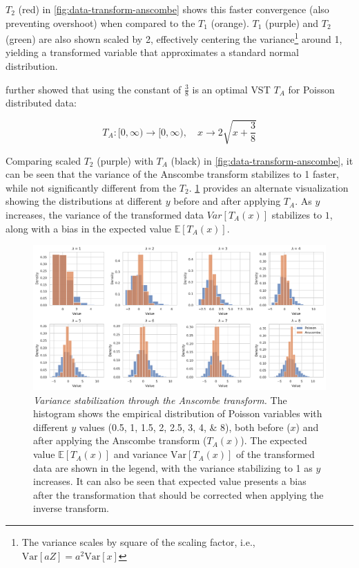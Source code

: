 $T_2$ (red) in \cref{fig:data-transform-anscombe} shows this faster convergence (also preventing overshoot) when compared to the $T_1$ (orange). $T_1$ (purple) and $T_2$ (green) are also shown scaled by \num{2}, effectively centering the variance\footnote{The variance scales by square of the scaling factor, i.e., $\text{Var}[aZ] = a^2 \text{Var}[x]$} around \num{1}, yielding a transformed variable that approximates a standard normal distribution.

\citeauthor{anscombeTransformationPoissonBinomial1948} \cite{anscombeTransformationPoissonBinomial1948} further showed that using the  constant of $\frac{3}{8}$ is an optimal \gls{VST} $T_A$ for Poisson distributed data:

\begin{equation}\label{eq:anscombe-transform}
    T_A: [0, \infty) \to [0, \infty), \quad x \to 2 \sqrt{x + \frac{3}{8}}
\end{equation}

Comparing scaled $T_2$ (purple) with $T_A$ (black) in \cref{fig:data-transform-anscombe}, it can be seen that the variance of the Anscombe transform stabilizes to \num{1} faster, while not significantly different from the $T_2$. \cref{fig:hist-anscombe} provides an alternate visualization showing the distributions at different $y$ before and after applying $T_A$. As $y$ increases, the variance of the transformed data $Var[T_A(x)]$ stabilizes to $1$, along with a bias in the expected value $\mathbb{E}[T_A(x)]$.

\begin{figure}
    \centering
    \includegraphics[width=1\linewidth]{images/hist_anscombe.pdf}
    \caption{\textit{Variance stabilization through the Anscombe transform.} The histogram shows the empirical distribution of Poisson  variables with different $y$ values (\numlist{0.5;1;1.5;2;2.5;3;4;8}), both before ($x$) and after applying the Anscombe transform ($T_A(x)$). The expected value $\mathbb{E}[T_A(x)]$ and variance $\text{Var}[T_A(x)]$ of the transformed data are shown in the legend, with the variance stabilizing to \num{1} as $y$ increases. It can also be seen that expected value presents a bias after the transformation that should be corrected when applying the inverse transform.}
    \label{fig:hist-anscombe}
\end{figure}

